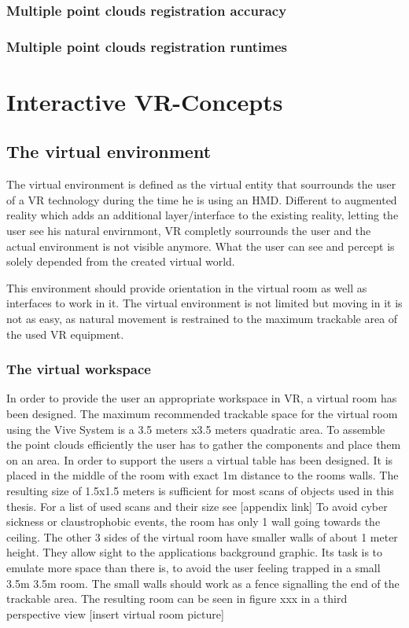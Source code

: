 \documentclass[hyperref,english,bachelorofscience,bibnum]{cgvpub}
\begin{document}
\subsection{Multiple point clouds registration accuracy}

\subsection{Multiple point clouds registration runtimes}

\chapter{Interactive VR-Concepts}

\section{The virtual environment}

The virtual environment is defined as the virtual entity that sourrounds the user of a VR technology during the time he is using an HMD. Different to augmented reality which adds an additional layer/interface to the existing reality, letting the user see his natural envirnmont, VR completly sourrounds the user and the actual environment is not visible anymore. What the user can see and percept is solely depended from the created virtual world\cite{Milgram1995}.

This environment should provide orientation in the virtual room as well as interfaces to work in it. The virtual environment is not limited but moving in it is not as easy, as natural movement is restrained to the maximum trackable area of the used VR equipment. 

\subsection{The virtual workspace}

In order to provide the user an appropriate workspace in VR, a virtual room has been designed. The maximum recommended trackable space for the virtual room using the Vive System is a 3.5 meters x3.5 meters quadratic area.
To assemble the point clouds efficiently the user has to gather the components and place them on an area. In order to support the users a virtual table has been designed. It is placed in the middle of the room with exact 1m distance to the rooms walls. The resulting size of 1.5x1.5 meters is sufficient for most scans of objects used in this thesis. For a list of used scans and their size see [appendix link]
To avoid cyber sickness or claustrophobic events, the room has only 1 wall going towards the ceiling. The other 3 sides of the virtual room have smaller walls of about 1 meter height. They allow sight to the applications background graphic. Its task is to emulate more space than there is, to avoid the user feeling trapped in a small 3.5m 3.5m room. The small walls should work as a fence signalling the end of the trackable area. The resulting room can be seen in figure xxx in a third perspective view [insert virtual room picture]
 
\end{document}
